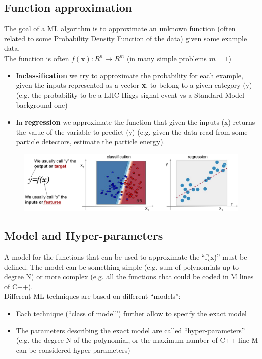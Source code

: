 \subsection{Function approximation}

The goal of a ML algorithm is to approximate an unknown function (often related to some Probability Density Function of the data) given some example data.\\
The function is often $ f(\textbf{x}): R^n \rightarrow R^m$ (in many simple problems $m=1$)
\begin{itemize}
	\item In\textbf{classification} we try to approximate the probability for each example, given the inputs represented as a vector \textbf{x}, to belong to a given category (y) (e.g. the probability to be a LHC Higgs signal event vs a Standard Model background one)
	\item In \textbf{regression} we approximate the function that given the inputs (x) returns the value of the variable to predict (y) (e.g. given the data read from some particle detectors, estimate the particle energy).
\end{itemize}

\begin{figure}[ht]
	\centering
	\includegraphics[width=1\textwidth]{figure_ml/function_approx.png}
\end{figure}
\FloatBarrier

\subsection{Model and Hyper-parameters}
A model for the functions that can be used to approximate the “f(x)” must be defined. The model can be something simple (e.g. sum of polynomials up to degree N) or more complex (e.g. all the functions that could be coded in M lines of C++).\\
Different ML techniques are based on different “models”:
\begin{itemize}
	\item Each technique (“class of model”) further allow to specify the exact model
	\item The parameters describing the exact model are called “hyper-parameters” (e.g. the degree N of the polynomial, or the maximum number of C++ line M can be considered hyper
	parameters)
\end{itemize}

